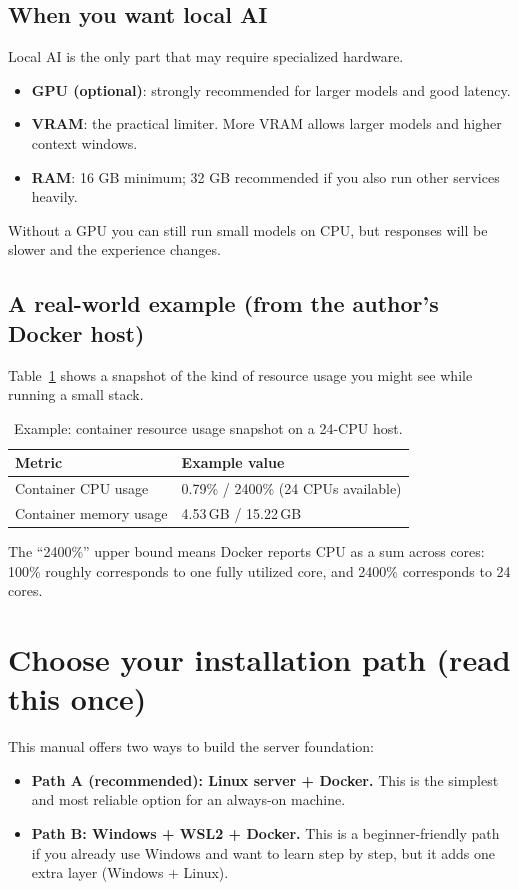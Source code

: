 \subsection{When you want local AI}
Local AI is the only part that may require specialized hardware.
\begin{itemize}[leftmargin=*]
  \item \textbf{GPU (optional)}: strongly recommended for larger models and good latency.
  \item \textbf{VRAM}: the practical limiter. More VRAM allows larger models and higher context windows.
  \item \textbf{RAM}: 16 GB minimum; 32 GB recommended if you also run other services heavily.
\end{itemize}
Without a GPU you can still run small models on CPU, but responses will be slower and the experience changes.

\subsection{A real-world example (from the author’s Docker host)}
Table~\ref{tab:docker_resources_example} shows a snapshot of the kind of resource usage you might see while running a small stack.

\begin{table}[h]
\centering
\caption{Example: container resource usage snapshot on a 24-CPU host.}
\label{tab:docker_resources_example}
\begin{tabular}{@{}ll@{}}
\toprule
Metric & Example value \\ \midrule
Container CPU usage & 0.79\% / 2400\% (24 CPUs available) \\
Container memory usage & 4.53\,GB / 15.22\,GB \\
\bottomrule
\end{tabular}
\end{table}

The ``2400\%'' upper bound means Docker reports CPU as a sum across cores: 100\% roughly corresponds to one fully utilized core, and 2400\% corresponds to 24 cores.

\section{Choose your installation path (read this once)}
This manual offers two ways to build the server foundation:

\begin{itemize}[leftmargin=*]
  \item \textbf{Path A (recommended): Linux server + Docker.} This is the simplest and most reliable option for an always-on machine.
  \item \textbf{Path B: Windows + WSL2 + Docker.} This is a beginner-friendly path if you already use Windows and want to learn step by step, but it adds one extra layer (Windows + Linux).
\end{itemize}

